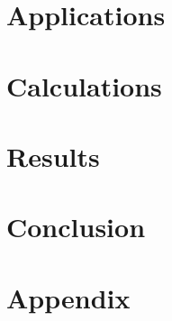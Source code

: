 \documentclass[12pt]{article}   %
\theoremstyle{definition}
\numberwithin{equation}{section}
\begin{document}
\section{Applications}
\label{APPM2350proj01sec03}


\section{Calculations} \label{APPM2350proj01sec05}


\section{Results} \label{APPM2350proj01sec06}


\section{Conclusion} \label{APPM2350proj01sec07}


\section{Appendix} \label{APPM2350proj01sec08}
\end{document}
